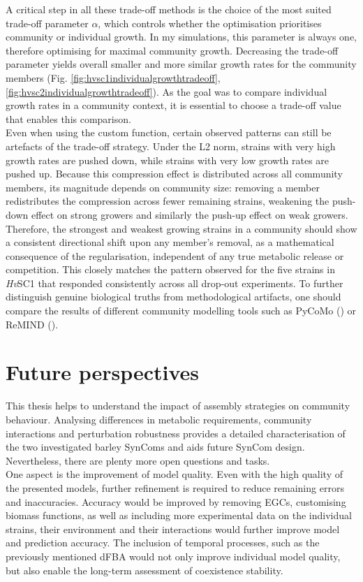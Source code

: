 A critical step in all these trade-off methods is the choice of the most suited trade-off parameter $\alpha$, which controls whether the optimisation prioritises community or individual growth. In my simulations, this parameter is always one, therefore optimising for maximal community growth. Decreasing the trade-off parameter yields overall smaller and more similar growth rates for the community members (Fig. \ref{fig:hvsc1individualgrowthtradeoff}, \ref{fig:hvsc2individualgrowthtradeoff}). As the goal was to compare individual growth rates in a community context, it is essential to choose a trade-off value that enables this comparison.  
\\


Even when using the custom function, certain observed patterns can still be artefacts of the trade-off strategy. Under the L2 norm, strains with very high growth rates are pushed down, while strains with very low growth rates are pushed up. Because this compression effect is distributed across all community members, its magnitude depends on community size: removing a member redistributes the compression across fewer remaining strains, weakening the push-down effect on strong growers and similarly the push-up effect on weak growers. Therefore, the strongest and weakest growing strains in a community should show a consistent directional shift upon any member's removal, as a mathematical consequence of the regularisation, independent of any true metabolic release or competition. This closely matches the pattern observed for the five strains in \textit{Hv}SC1 that responded consistently across all drop-out experiments. To further distinguish genuine biological truths from methodological artifacts, one should compare the results of different community modelling tools such as PyCoMo (\cite{predl_pycomo_2024}) or ReMIND (\cite{oftadeh_constraint-based_2024}). 

\section{Future perspectives}
This thesis helps to understand the impact of assembly strategies on community behaviour. Analysing differences in metabolic requirements, community interactions and perturbation robustness provides a detailed characterisation of the two investigated barley SynComs and aids future SynCom design. Nevertheless, there are plenty more open questions and tasks.
\\

 
One aspect is the improvement of model quality. Even with the high quality of the presented models, further refinement is required to reduce remaining errors and inaccuracies. Accuracy would be improved by removing EGCs, customising biomass functions, as well as including more experimental data on the individual strains, their environment and their interactions would further improve model and prediction accuracy. The inclusion of temporal processes, such as the previously mentioned dFBA would not only improve individual model quality, but also enable the long-term assessment of coexistence stability.
\\

